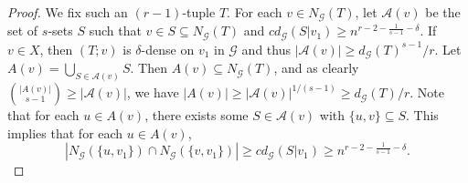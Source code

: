 \documentclass[11pt]{article}
\begin{document}
\begin{proof}
We fix such an $(r-1)$-tuple $T$.
For each $v\in N_{\mathcal G}(T)$, let $\mathcal A(v)$ be the set of $s$-sets $S$ such that $v\in S\subseteq N_{\mathcal G}(T)$ and $cd_{\mathcal G}(S|v_{1})\ge n^{r-2-\frac{1}{s-1}- \delta}$.
If $v\in X$, then $(T;v)$ is $\delta $-dense on $v_1$ in $\mathcal G$ and thus $|\mathcal A(v)|\ge d_{\mathcal G}(T)^{s-1}/ r$.
Let $A(v)=\bigcup_{S\in \mathcal A(v)}S$.
Then $A(v)\subseteq N_{\mathcal G}(T)$, and as clearly $\binom{|A(v)|}{s-1}\geq |\mathcal A(v)|$, we have $|A(v)|\ge |\mathcal A(v)|^{1/(s-1)} \ge d_{\mathcal G}(T)/r$.
Note that for each $u\in A(v)$,
there exists some $S\in \mathcal A(v)$ with $\{u,v\}\subseteq S$.
This implies that for each $u\in A(v)$,
\begin{equation}\label{equ:d(u,v1)}
|N_{\mathcal G}(\{u,v_{1}\})\cap N_{\mathcal G}(\{v,v_{1}\})|\ge cd_{\mathcal G}(S|v_{1})\ge n^{r-2-\frac{1}{s-1} -\delta}.
\end{equation}


\end{proof}
\end{document}
